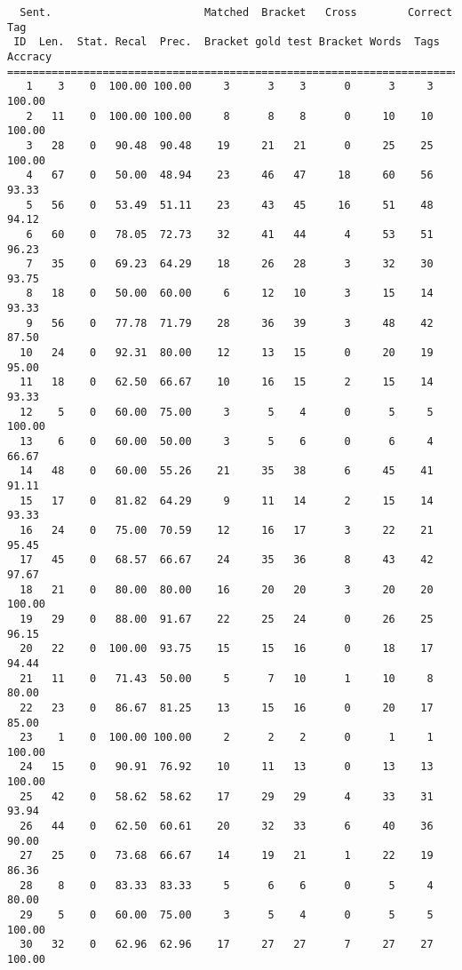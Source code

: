 \scriptsize
\begin{verbatim}
  Sent.                        Matched  Bracket   Cross        Correct Tag
 ID  Len.  Stat. Recal  Prec.  Bracket gold test Bracket Words  Tags Accracy
============================================================================
   1    3    0  100.00 100.00     3      3    3      0      3     3   100.00
   2   11    0  100.00 100.00     8      8    8      0     10    10   100.00
   3   28    0   90.48  90.48    19     21   21      0     25    25   100.00
   4   67    0   50.00  48.94    23     46   47     18     60    56    93.33
   5   56    0   53.49  51.11    23     43   45     16     51    48    94.12
   6   60    0   78.05  72.73    32     41   44      4     53    51    96.23
   7   35    0   69.23  64.29    18     26   28      3     32    30    93.75
   8   18    0   50.00  60.00     6     12   10      3     15    14    93.33
   9   56    0   77.78  71.79    28     36   39      3     48    42    87.50
  10   24    0   92.31  80.00    12     13   15      0     20    19    95.00
  11   18    0   62.50  66.67    10     16   15      2     15    14    93.33
  12    5    0   60.00  75.00     3      5    4      0      5     5   100.00
  13    6    0   60.00  50.00     3      5    6      0      6     4    66.67
  14   48    0   60.00  55.26    21     35   38      6     45    41    91.11
  15   17    0   81.82  64.29     9     11   14      2     15    14    93.33
  16   24    0   75.00  70.59    12     16   17      3     22    21    95.45
  17   45    0   68.57  66.67    24     35   36      8     43    42    97.67
  18   21    0   80.00  80.00    16     20   20      3     20    20   100.00
  19   29    0   88.00  91.67    22     25   24      0     26    25    96.15
  20   22    0  100.00  93.75    15     15   16      0     18    17    94.44
  21   11    0   71.43  50.00     5      7   10      1     10     8    80.00
  22   23    0   86.67  81.25    13     15   16      0     20    17    85.00
  23    1    0  100.00 100.00     2      2    2      0      1     1   100.00
  24   15    0   90.91  76.92    10     11   13      0     13    13   100.00
  25   42    0   58.62  58.62    17     29   29      4     33    31    93.94
  26   44    0   62.50  60.61    20     32   33      6     40    36    90.00
  27   25    0   73.68  66.67    14     19   21      1     22    19    86.36
  28    8    0   83.33  83.33     5      6    6      0      5     4    80.00
  29    5    0   60.00  75.00     3      5    4      0      5     5   100.00
  30   32    0   62.96  62.96    17     27   27      7     27    27   100.00

\end{verbatim}
